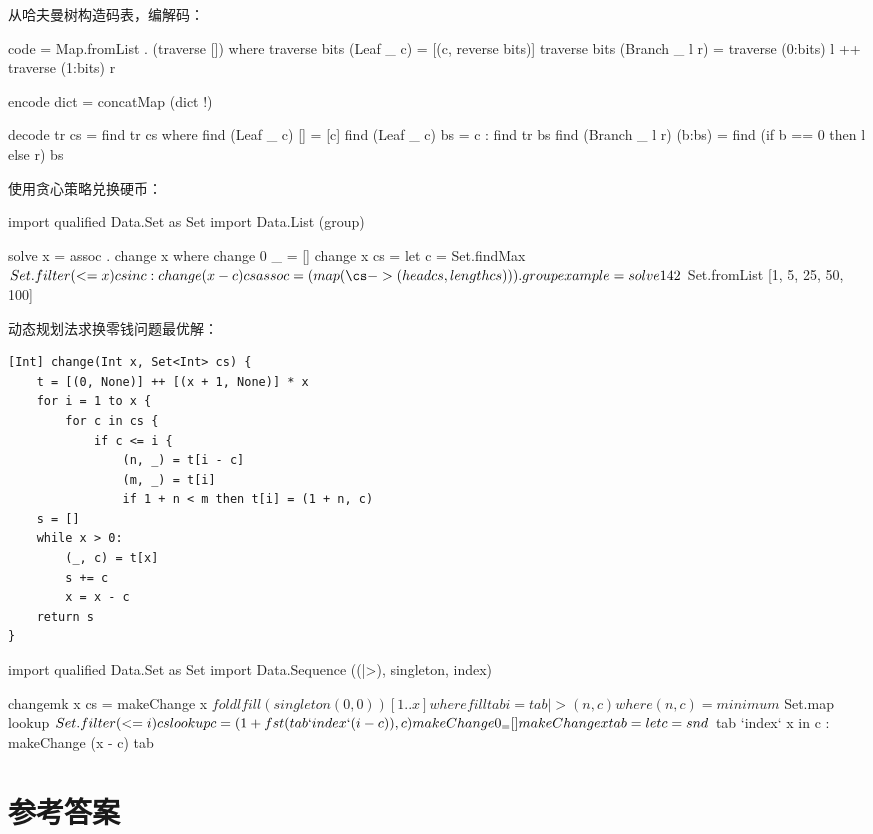 \documentclass[b5paper]{ctexart}
\begin{document}
从哈夫曼树构造码表，编解码：

\begin{Haskell}
code = Map.fromList . (traverse []) where
  traverse bits (Leaf _ c) = [(c, reverse bits)]
  traverse bits (Branch _ l r) = traverse (0:bits) l ++ traverse (1:bits) r

encode dict = concatMap (dict !)

decode tr cs = find tr cs where
  find (Leaf _ c) [] = [c]
  find (Leaf _ c) bs = c : find tr bs
  find (Branch _ l r) (b:bs) = find (if b == 0 then l else r) bs
\end{Haskell} %

使用贪心策略兑换硬币：

\begin{Haskell}
import qualified Data.Set as Set
import Data.List (group)

solve x = assoc . change x where
  change 0 _ = []
  change x cs = let c = Set.findMax $ Set.filter (<= x) cs in c : change (x - c) cs
  assoc = (map (\cs -> (head cs, length cs))) . group

example = solve 142 $ Set.fromList [1, 5, 25, 50, 100]
\end{Haskell} %

动态规划法求换零钱问题最优解：

\begin{lstlisting}[language = Bourbaki]
[Int] change(Int x, Set<Int> cs) {
    t = [(0, None)] ++ [(x + 1, None)] * x
    for i = 1 to x {
        for c in cs {
            if c <= i {
                (n, _) = t[i - c]
                (m, _) = t[i]
                if 1 + n < m then t[i] = (1 + n, c)
    s = []
    while x > 0:
        (_, c) = t[x]
        s += c
        x = x - c
    return s
}
\end{lstlisting}

\begin{Haskell}
import qualified Data.Set as Set
import Data.Sequence ((|>), singleton, index)

changemk x cs = makeChange x $ foldl fill (singleton (0, 0)) [1..x] where
  fill tab i = tab |> (n, c) where
    (n, c) = minimum $ Set.map lookup $ Set.filter (<= i) cs
    lookup c  = (1 + fst (tab `index` (i - c)), c)
  makeChange 0 _ = []
  makeChange x tab = let c = snd $ tab `index` x in c : makeChange (x - c) tab
\end{Haskell} %

\ifx\wholebook\relax\else
\section{参考答案}
\shipoutAnswer
\end{document}
